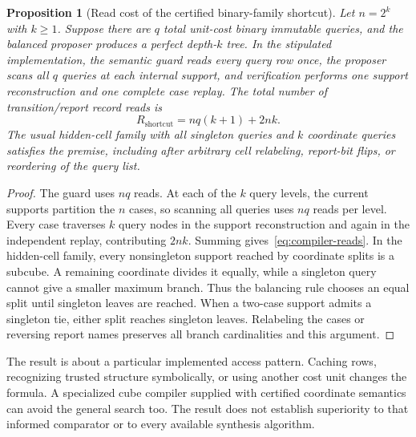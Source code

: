 \documentclass[11pt,letterpaper]{article}
\theoremstyle{plain}
\newtheorem{proposition}[theorem]{Proposition}
\theoremstyle{definition}
\begin{document}
\begin{proposition}[Read cost of the certified binary-family shortcut]\label{prop:compiler-work}
Let $n=2^k$ with $k\geq1$. Suppose there are $q$ total unit-cost binary immutable queries, and the balanced proposer produces a perfect depth-$k$ tree. In the stipulated implementation, the semantic guard reads every query row once, the proposer scans all $q$ queries at each internal support, and verification performs one support reconstruction and one complete case replay. The total number of transition/report record reads is
\begin{equation}\label{eq:compiler-reads}
R_{\mathrm{shortcut}}=nq(k+1)+2nk.
\end{equation}
The usual hidden-cell family with all singleton queries and $k$ coordinate queries satisfies the premise, including after arbitrary cell relabeling, report-bit flips, or reordering of the query list.
\end{proposition}
\begin{proof}
The guard uses $nq$ reads. At each of the $k$ query levels, the current supports partition the $n$ cases, so scanning all queries uses $nq$ reads per level. Every case traverses $k$ query nodes in the support reconstruction and again in the independent replay, contributing $2nk$. Summing gives~\eqref{eq:compiler-reads}. In the hidden-cell family, every nonsingleton support reached by coordinate splits is a subcube. A remaining coordinate divides it equally, while a singleton query cannot give a smaller maximum branch. Thus the balancing rule chooses an equal split until singleton leaves are reached. When a two-case support admits a singleton tie, either split reaches singleton leaves. Relabeling the cases or reversing report names preserves all branch cardinalities and this argument.
\end{proof}

The result is about a particular implemented access pattern. Caching rows, recognizing trusted structure symbolically, or using another cost unit changes the formula. A specialized cube compiler supplied with certified coordinate semantics can avoid the general search too. The result does not establish superiority to that informed comparator or to every available synthesis algorithm.
\end{document}

